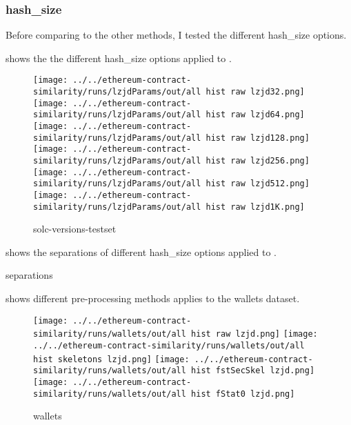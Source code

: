 \documentclass[../main.tex]{subfiles}
\begin{document}
\subsubsection{hash\_size}
Before comparing to the other methods, I tested the different hash\_size options.

 shows the the different hash\_size options applied to .

\begin{figure*}[ht!]
  \centering
  \texttt{[image: ../../ethereum-contract-similarity/runs/lzjdParams/out/all hist raw lzjd32.png]}
  \texttt{[image: ../../ethereum-contract-similarity/runs/lzjdParams/out/all hist raw lzjd64.png]}
  \texttt{[image: ../../ethereum-contract-similarity/runs/lzjdParams/out/all hist raw lzjd128.png]}\\
  \texttt{[image: ../../ethereum-contract-similarity/runs/lzjdParams/out/all hist raw lzjd256.png]}
  \texttt{[image: ../../ethereum-contract-similarity/runs/lzjdParams/out/all hist raw lzjd512.png]}
  \texttt{[image: ../../ethereum-contract-similarity/runs/lzjdParams/out/all hist raw lzjd1K.png]}\\

  \caption{solc-versions-testset}
  \label{fig:hist_solc_lzjd}
\end{figure*}

 shows the separations of different hash\_size options applied to .

\begin{table}[ht!]
  \centering
  \caption{separations}
  \label{tbl:lz_sep}
\end{table}

 shows different pre-processing methods applies to the wallets dataset.

\begin{figure*}[ht!]
  \centering
  \texttt{[image: ../../ethereum-contract-similarity/runs/wallets/out/all hist raw lzjd.png]}
  \texttt{[image: ../../ethereum-contract-similarity/runs/wallets/out/all hist skeletons lzjd.png]}
  \texttt{[image: ../../ethereum-contract-similarity/runs/wallets/out/all hist fstSecSkel lzjd.png]}
  \texttt{[image: ../../ethereum-contract-similarity/runs/wallets/out/all hist fStat0 lzjd.png]}\\

  \caption{wallets}
  \label{fig:hist_wallets_lzjd}
\end{figure*}
\end{document}
